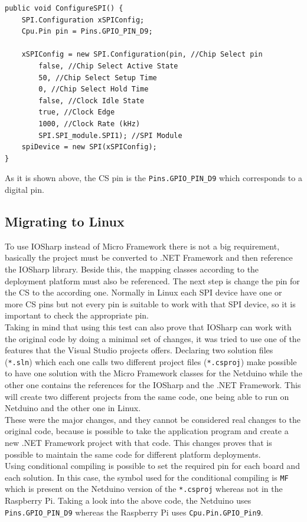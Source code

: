 \begin{lstlisting}[language=CSharp, caption={SPIApi.cs - Configuring SPI for the MFRC522 in Netduino Plus}]
public void ConfigureSPI() {
    SPI.Configuration xSPIConfig;
    Cpu.Pin pin = Pins.GPIO_PIN_D9;

    xSPIConfig = new SPI.Configuration(pin, //Chip Select pin
        false, //Chip Select Active State
        50, //Chip Select Setup Time
        0, //Chip Select Hold Time
        false, //Clock Idle State
        true, //Clock Edge
        1000, //Clock Rate (kHz)
        SPI.SPI_module.SPI1); //SPI Module
    spiDevice = new SPI(xSPIConfig);
}
\end{lstlisting}
As it is shown above, the \gls{CS} pin is the \verb!Pins.GPIO_PIN_D9! which corresponds to a digital pin.

\subsection{Migrating to Linux}\label{S:IOEx-SPI-Migrating-to-IOSharp}
To use IOSharp instead of Micro Framework there is not a big requirement, basically the project must be converted to .NET Framework and then reference the IOSharp library. Beside this, the mapping classes according to the deployment platform must also be referenced. The next step is change the pin for the \gls{CS} to the according one. Normally in Linux each SPI device have one or more \gls{CS} pins but not every pin is suitable to work with that SPI device, so it is important to check the appropriate pin.
\\
Taking in mind that using this test can also prove that IOSharp can work with the original code by doing a minimal set of changes, it was tried to use one of the features that the Visual Studio projects offers. Declaring two solution files (\verb!*.sln!) which each one calls two different project files (\verb!*.csproj!) make possible to have one solution with the Micro Framework classes for the Netduino while the other one contains the references for the IOSharp and the .NET Framework. This will create two different projects from the same code, one being able to run on Netduino and the other one in Linux.
\\
These were the major changes, and they cannot be considered real changes to the original code, because is possible to take the application program and create a new .NET Framework project with that code. This changes proves that is possible to maintain the same code for different platform deployments.
\\
Using conditional compiling is possible to set the required pin for each board and each solution. In this case, the symbol used for the conditional compiling is \verb!MF! which is present on the Netduino version of the \verb!*.csproj! whereas not in the Raspberry Pi. Taking a look into the above code, the Netduino uses \verb!Pins.GPIO_PIN_D9! whereas the Raspberry Pi uses \verb!Cpu.Pin.GPIO_Pin9!.

